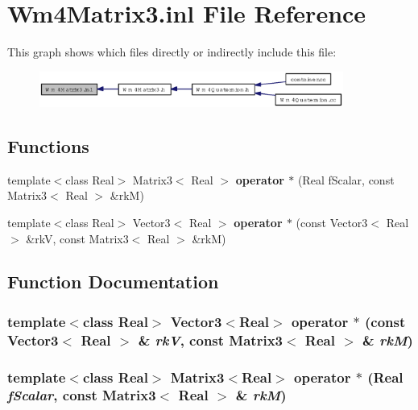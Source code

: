 \section{Wm4Matrix3.inl File Reference}
\label{Wm4Matrix3_8inl}


This graph shows which files directly or indirectly include this file:\begin{figure}[H]
\begin{center}
\leavevmode
\includegraphics[width=283pt]{Wm4Matrix3_8inl__dep__incl}
\end{center}
\end{figure}
\subsection*{Functions}
\begin{CompactItemize}
\item 
template$<$class Real$>$ Matrix3$<$ Real $>$ {\bf operator $\ast$} (Real f\-Scalar, const Matrix3$<$ Real $>$ \&rk\-M)
\item 
template$<$class Real$>$ Vector3$<$ Real $>$ {\bf operator $\ast$} (const Vector3$<$ Real $>$ \&rk\-V, const Matrix3$<$ Real $>$ \&rk\-M)
\end{CompactItemize}


\subsection{Function Documentation}
\subsubsection{\setlength{\rightskip}{0pt plus 5cm}template$<$class Real$>$ Vector3$<$Real$>$ operator $\ast$ (const Vector3$<$ Real $>$ \& {\em rk\-V}, const Matrix3$<$ Real $>$ \& {\em rk\-M})\hspace{0.3cm}{\tt  [inline]}}\label{Wm4Matrix3_8inl_8e9ddfcf935e4b9c24258639cd868d5b}


\subsubsection{\setlength{\rightskip}{0pt plus 5cm}template$<$class Real$>$ Matrix3$<$Real$>$ operator $\ast$ (Real {\em f\-Scalar}, const Matrix3$<$ Real $>$ \& {\em rk\-M})\hspace{0.3cm}{\tt  [inline]}}\label{Wm4Matrix3_8inl_09a113bd9df613de432aa0e188add8fa}


